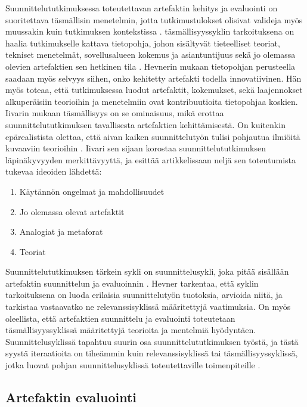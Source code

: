 \documentclass[utf8]{gradu3}
\begin{document}
Suunnittelututkimuksessa toteutettavan artefaktin kehitys ja evaluointi on suoritettava täsmällisin menetelmin, jotta tutkimustulokset olisivat valideja myös muussakin kuin tutkimuksen kontekstissa \parencite*{hevner2004}. täsmällisyyssyklin tarkoituksena on haalia tutkimukselle kattava tietopohja, johon sisältyvät tieteelliset teoriat, tekniset menetelmät, sovellusalueen kokemus ja asiantuntijuus sekä jo olemassa olevien artefaktien sen hetkinen tila \parencite{cycles}. Hevnerin \parencite*{cycles} mukaan tietopohjan perusteella saadaan myös selvyys siihen, onko kehitetty artefakti todella innovatiivinen. Hän myös toteaa, että tutkimuksessa luodut artefaktit, kokemukset, sekä laajennokset alkuperäisiin teorioihin ja menetelmiin ovat kontribuutioita tietopohjaa koskien. Iivarin mukaan \parencite*{pragmatic} täsmällisyys on se ominaisuus, mikä erottaa suunnittelututkimuksen tavallisesta artefaktien kehittämisestä.  On kuitenkin epärealistista olettaa, että aivan kaiken suunnittelutyön tulisi pohjautua ilmiöitä kuvaaviin teorioihin \parencite{cycles, pragmatic}. Iivari \parencite*{pragmatic} sen sijaan korostaa suunnittelututkimuksen läpinäkyvyyden merkittävyyttä, ja esittää artikkelissaan neljä sen toteutumista tukevaa ideoiden lähdettä:

\begin{enumerate}
  \item Käytännön ongelmat ja mahdollisuudet
  \item Jo olemassa olevat artefaktit
  \item Analogiat ja metaforat
  \item Teoriat
\end{enumerate}

Suunnittelututkimuksen tärkein sykli on suunnittelusykli, joka pitää sisällään artefaktin suunnittelun ja evaluoinnin \parencite{cycles}. Hevner \parencite*{cycles} tarkentaa, että syklin tarkoituksena on luoda erilaisia suunnittelutyön tuotoksia, arvioida niitä, ja tarkistaa vastaavatko ne relevanssisyklissä määritettyjä vaatimuksia. On myös oleellista, että artefaktien suunnittelu ja evaluointi toteutetaan täsmällisyyssyklissä määritettyjä teorioita ja mentelmiä hyödyntäen. Suunnittelusyklissä tapahtuu suurin osa suunnittelututkimuksen työstä, ja tästä syystä iteraatioita on tiheämmin kuin relevanssisyklissä tai täsmällisyyssyklissä, jotka luovat pohjan suunnittelusyklissä toteutettaville toimenpiteille \parencite{cycles}.

\subsection{Artefaktin evaluointi}
\label{kriteerit}
\end{document}
